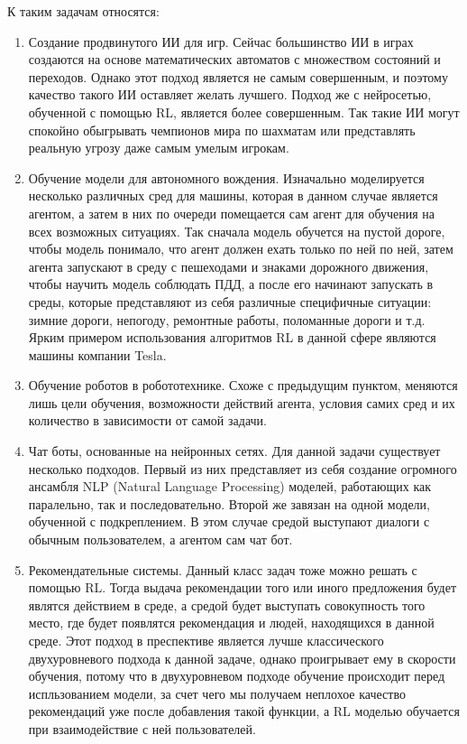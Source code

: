 \documentclass[bachelor, och, coursework]{shiza}
\begin{document}
К таким задачам относятся:
\begin{enumerate}
    \item Создание продвинутого ИИ для игр. Сейчас большинство ИИ в играх создаются на основе математических автоматов с множеством состояний
    и переходов. Однако этот подход является не самым совершенным, и поэтому качество такого ИИ оставляет желать лучшего. Подход же с нейросетью,
    обученной с помощью RL, является более совершенным. Так такие ИИ могут спокойно обыгрывать чемпионов мира по шахматам или представлять реальную
    угрозу даже самым умелым игрокам.
    \item Обучение модели для автономного вождения. Изначально моделируется несколько различных сред для машины, которая в данном случае является агентом,
    а затем в них по очереди помещается сам агент для обучения на всех возможных ситуациях. Так сначала модель обучется на пустой дороге, чтобы модель понимало,
    что агент должен ехать только по ней по ней, затем агента запускают в среду с пешеходами и знаками дорожного движения, чтобы научить модель соблюдать ПДД,
    а после его начинают запускать в среды, которые представляют из себя различные специфичные ситуации: зимние дороги, непогоду, ремонтные работы, поломанные
    дороги и т.д. Ярким примером использования алгоритмов RL в данной сфере являются машины компании Tesla.
    \item Обучение роботов в робототехнике. Схоже с предыдущим пунктом, меняются лишь цели обучения, возможности действий агента, условия самих сред и их количество
    в зависимости от самой задачи.
    \item Чат боты, основанные на нейронных сетях. Для данной задачи существует несколько подходов. Первый из них представляет из себя создание огромного ансамбля
    NLP (Natural Language Processing) моделей, работающих как паралельно, так и последовательно. Второй же завязан на одной модели, обученной с подкреплением. В
    этом случае средой выступают диалоги с обычным пользователем, а агентом сам чат бот.
    \item Рекомендательные системы. Данный класс задач тоже можно решать с помощью RL. Тогда выдача рекомендации того или иного предложения будет являтся действием в среде,
    а средой будет выступать совокупность того место, где будет появлятся рекомендация и людей, находящихся в данной среде. Этот подход в преспективе является лучше
    классического двухуровневого подхода к данной задаче, однако проигрывает ему в скорости обучения, потому что в двухуровневом подходе обучение происходит
    перед испльзованием модели, за счет чего мы получаем неплохое качество рекомендаций уже после добавления такой функции, а RL моделью обучается при 
    взаимодействие с ней пользователей.
\end{enumerate}
\end{document}
